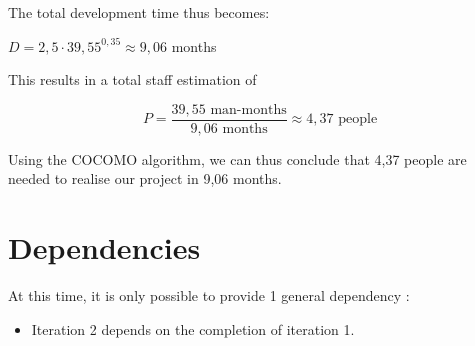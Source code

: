 \documentclass[salesmen, twoside]{../../../templates/latex/2009/softproj}
\begin{document}
\begin{projdoc}
			The total development time thus becomes:
			
			\begin{center}
				$ D = 2,5 \cdot 39,55^{0,35} \approx 9,06 $ months
			\end{center}
			
			This results in a total staff estimation of
			
				\[ P = \frac{39,55 \textrm{ man-months}}{9,06 \textrm{ months}} \approx 4,37 \textrm{ people} \]
			
			Using the COCOMO algorithm, we can thus conclude that 4,37 people are needed to
			realise our project in 9,06 months. 
			
			\section {Dependencies}
			
			At this time, it is only possible to provide 1 general dependency :
			
			\begin{itemize}
				
				\item Iteration 2 depends on the completion of iteration 1.
				
			\end{itemize}
			
			

\end{projdoc}
\end{document}

